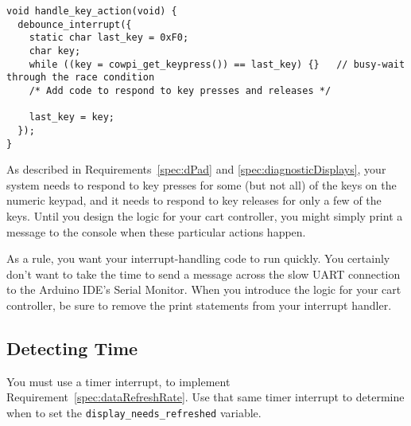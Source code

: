 \begin{lstlisting}[basicstyle=\small]
void handle_key_action(void) {
  debounce_interrupt({
    static char last_key = 0xF0;
    char key;
    while ((key = cowpi_get_keypress()) == last_key) {}   // busy-wait through the race condition
    /* Add code to respond to key presses and releases */

    last_key = key;
  });
}
\end{lstlisting}

As described in Requirements~\ref{spec:dPad} and \ref{spec:diagnosticDisplays}, your system needs to respond to key presses for some (but not all) of the keys on the numeric keypad,
and it needs to respond to key releases for only a few of the keys.
Until you design the logic for your cart controller, you might simply print a message to the console when these particular actions happen.

As a rule, you want your interrupt-handling code to run quickly.
You certainly don't want to take the time to send a message across the slow UART connection to the Arduino IDE's Serial Monitor.
When you introduce the logic for your cart controller, be sure to remove the print statements from your interrupt handler.

\subsection{Detecting Time}

You must use a timer interrupt, to implement Requirement~\ref{spec:dataRefreshRate}.
Use that same timer interrupt to determine when to set the \lstinline{display_needs_refreshed} variable.

